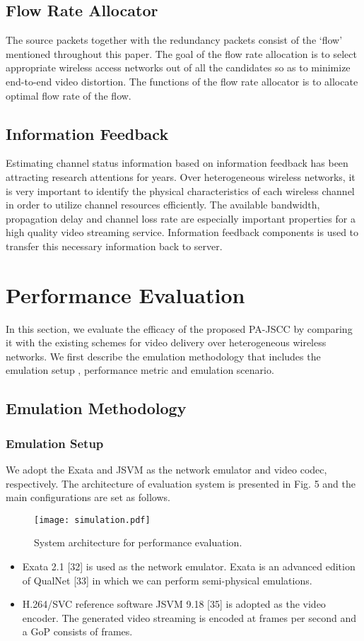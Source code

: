 \documentclass[journal]{IEEEtran}
\begin{document}
\subsection{Flow Rate Allocator}
The source packets together with the redundancy packets consist of the `flow' mentioned throughout this paper. The goal of the flow rate allocation is to select appropriate wireless access networks out of all the candidates so as to minimize end-to-end video distortion. The functions of the flow rate allocator is to allocate optimal flow rate of the flow.
\subsection{Information Feedback}
Estimating channel status information based on information feedback has been attracting research attentions for years. Over heterogeneous wireless networks, it is very important to identify the physical characteristics of each wireless channel in order to utilize channel resources efficiently. The available bandwidth, propagation delay and channel loss rate are especially important properties for a high quality video streaming service. Information feedback components is used to transfer this necessary information back to server.

\section{Performance Evaluation}

In this section, we evaluate the efficacy of the proposed PA-JSCC by comparing it with the existing schemes for video delivery over heterogeneous wireless networks. We first describe the emulation methodology that includes the emulation setup , performance metric and emulation scenario.
\subsection{Emulation Methodology}
\subsubsection{Emulation Setup}
We adopt the Exata and JSVM as the network emulator and video codec, respectively. The architecture of evaluation system is presented in Fig. 5 and the main configurations are set as follows.
\begin{figure}[htbp]
\vspace{-5pt}
\centering
 \texttt{[image: simulation.pdf]}
 \caption{System architecture for performance evaluation.}\label{7}
 \vspace{-10pt}
\end{figure}
\begin{itemize}
    \item Exata 2.1 [32] is used as the network emulator. Exata is an advanced edition of QualNet [33] in which we can perform semi-physical emulations.
    \item H.264/SVC reference software JSVM 9.18 [35] is adopted as the video encoder. The generated video streaming is encoded at  frames per second and a GoP consists of  frames.
\end{itemize}
\end{document}
